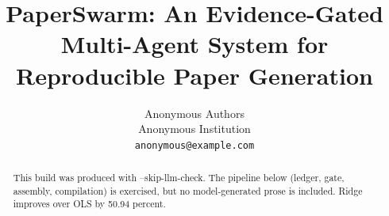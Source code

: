 \documentclass{article}
\title{PaperSwarm: An Evidence-Gated Multi-Agent System for Reproducible Paper Generation}
\author{Anonymous Authors \\
Anonymous Institution \\
\texttt{anonymous@example.com}}
\begin{document}
\maketitle

\begin{abstract}
This build was produced with --skip-llm-check. The pipeline below (ledger, gate, assembly, compilation) is exercised, but no model-generated prose is included. Ridge improves over OLS by 50.94 percent.
\end{abstract}










\end{document}
